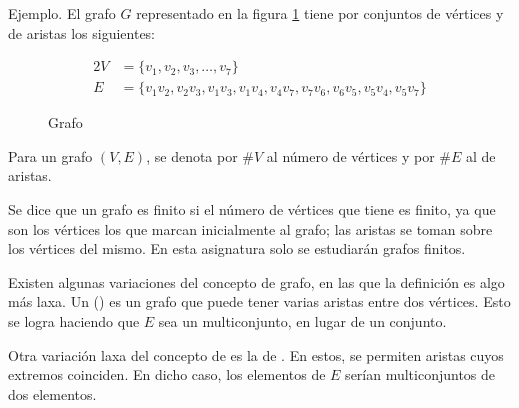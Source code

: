 Ejemplo. El grafo $G$ representado en la figura \ref{grafo-ejemplo-01} tiene
por conjuntos de vértices y de aristas los siguientes:

\begin{alignat*}{2}
  V &= \{v_1, v_2, v_3, \ldots, v_7\} \\
  E &= \{v_1 v_2, v_2 v_3, v_1 v_3, v_1 v_4, v_4 v_7, v_7 v_6, v_6 v_5, v_5
    v_4, v_5 v_7\}
\end{alignat*}

\begin{figure}\label{grafo-ejemplo-01}\caption{Grafo}
  \centering
\end{figure}

Para un grafo $(V, E)$, se denota por $\#V$ al número de vértices y por
$\#E$ al de aristas.

Se dice que un grafo es finito si el número de vértices que tiene es finito,
ya que son los vértices los que marcan inicialmente al grafo; las aristas se
toman sobre los vértices del mismo. En esta asignatura solo se estudiarán
grafos finitos.

Existen algunas variaciones del concepto de grafo, en las que la definición
es algo más laxa. Un  () es un grafo que
puede tener varias aristas entre dos vértices. Esto se logra haciendo que
$E$ sea un multiconjunto, en lugar de un conjunto.

Otra variación laxa del concepto de  es la de . En
estos, se permiten aristas cuyos extremos coinciden. En dicho caso, los
elementos de $E$ serían multiconjuntos de dos elementos.

